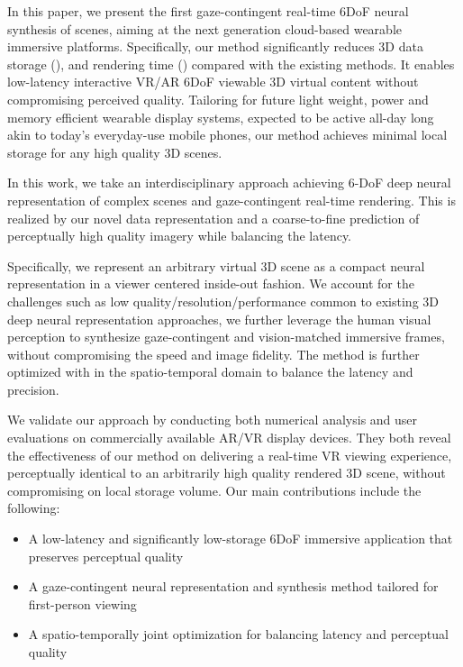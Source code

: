 
In this paper, we present the first gaze-contingent real-time 6DoF neural synthesis of scenes, aiming at the next generation cloud-based wearable immersive platforms.
Specifically, our method significantly reduces 3D data storage (), and rendering time () compared with the existing methods. It enables low-latency interactive VR/AR 6DoF viewable 3D virtual content without compromising perceived quality. Tailoring for future light weight, power and memory efficient wearable display systems, expected to be active all-day long akin to today's everyday-use mobile phones, our method achieves minimal local storage for any high quality 3D scenes. 


In this work, we take an interdisciplinary approach achieving 6-DoF deep neural representation of complex scenes and gaze-contingent real-time rendering. This is realized by our novel data representation and a coarse-to-fine prediction of perceptually high quality imagery while balancing the latency. 


Specifically, we represent an arbitrary virtual 3D scene as a compact neural representation in a viewer centered inside-out fashion. 
We account for the challenges such as low quality/resolution/performance common to existing 3D deep neural representation approaches, we further leverage the human visual perception to synthesize gaze-contingent and vision-matched immersive frames, without compromising the speed and image fidelity. 
The method is further optimized with in the spatio-temporal domain to balance the latency and precision.


We validate our approach by conducting both numerical analysis and user evaluations on commercially available AR/VR display devices. They both reveal the effectiveness of our method on delivering a real-time VR viewing experience, perceptually identical to an arbitrarily high quality rendered 3D scene, without compromising on local storage volume. Our main contributions include the following:
\begin{itemize}
    \item A low-latency and significantly low-storage 6DoF immersive application that preserves perceptual quality
    \item A gaze-contingent neural representation and synthesis method tailored for first-person viewing
    \item A spatio-temporally joint optimization for balancing latency and perceptual quality
\end{itemize}

